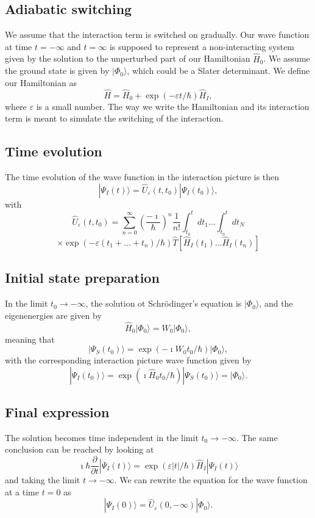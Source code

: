 \documentclass[%
oneside,                 %
final,                   %
10pt]{article}
\begin{document}
\subsection{Adiabatic switching}

We assume that the interaction term is switched on gradually. Our wave function at time $t=-\infty$ and $t=\infty$ is supposed to represent a non-interacting system
given by the solution to the unperturbed part of our Hamiltonian $\hat{H}_0$.
We assume the ground state is given by $|\Phi_0\rangle$, which could be a Slater determinant.
We define our Hamiltonian as
\[
\hat{H}=\hat{H}_0+\exp{(-\varepsilon t/\hbar)}\hat{H}_I,
\]
where $\varepsilon$ is a small number. The way we write the Hamiltonian 
and its interaction term is meant to simulate the switching of the interaction.

\subsection{Time evolution}

The time evolution of the wave function in the interaction picture is then
\[
|\Psi_I(t) \rangle = \hat{U}_{\varepsilon}(t,t_0)|\Psi_I(t_0)\rangle,
\]
with 
\[
\hat{U}_{\varepsilon}(t,t_0)=\sum_{n=0}^{\infty}\left(\frac{-\imath}{\hbar}\right)^n\frac{1}{n!}
\int_{t_0}^t dt_1\dots \int_{t_0}^t dt_N
\]
\[
\times \exp{(-\varepsilon(t_1+\dots+t_n)/\hbar)}\hat{T}\left[\hat{H}_I(t_1)\dots\hat{H}_I(t_n)\right]
\]

\subsection{Initial state preparation}

In the limit $t_0\rightarrow -\infty$, the solution ot Schrödinger's equation is
$|\Phi_0\rangle$, and the eigenenergies are given by 
\[
\hat{H}_0|\Phi_0\rangle=W_0|\Phi_0\rangle,
\]
meaning that 
\[
|\Psi_S(t_0)\rangle = \exp{(-\imath W_0t_0/\hbar)}|\Phi_0\rangle,
\]
with the corresponding interaction picture wave function given by
\[
|\Psi_I(t_0)\rangle = \exp{(\imath \hat{H}_0t_0/\hbar)}|\Psi_S(t_0)\rangle=|\Phi_0\rangle.
\]

\subsection{Final expression}

The solution becomes time independent in the limit $t_0\rightarrow -\infty$.
The same conclusion can be reached by looking at 
\[
\imath \hbar\frac{\partial }{\partial t}|\Psi_I(t)\rangle =
\exp{(\varepsilon |t|/\hbar)}\hat{H}_I|\Psi_I(t)\rangle 
\]
and taking the limit $t\rightarrow -\infty$.
We can rewrite the equation for the wave function at a time $t=0$ as
\[
|\Psi_I(0) \rangle = \hat{U}_{\varepsilon}(0,-\infty)|\Phi_0\rangle.
\]
\end{document}
